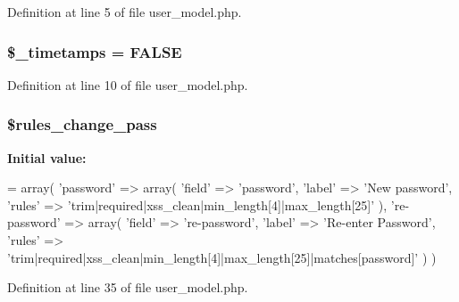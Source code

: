 Definition at line 5 of file user\-\_\-model.\-php.

\hypertarget{class_user__model_a0af45edfd9d801cbc582a244700cd824}{
\subsubsection[{\$\-\_\-timetamps}]{\setlength{\rightskip}{0pt plus 5cm}\$\-\_\-timetamps = F\-A\-L\-S\-E\hspace{0.3cm}{\ttfamily [protected]}}}\label{class_user__model_a0af45edfd9d801cbc582a244700cd824}


Definition at line 10 of file user\-\_\-model.\-php.

\hypertarget{class_user__model_adf938552f461a7e300f74469c1837bbf}{
\subsubsection[{\$rules\-\_\-change\-\_\-pass}]{\setlength{\rightskip}{0pt plus 5cm}\$rules\-\_\-change\-\_\-pass}}\label{class_user__model_adf938552f461a7e300f74469c1837bbf}
{\bfseries Initial value\-:}
\begin{DoxyCode}
= array(
        \textcolor{stringliteral}{'password'} => array(
            \textcolor{stringliteral}{'field'} => \textcolor{stringliteral}{'password'}, 
            \textcolor{stringliteral}{'label'} => \textcolor{stringliteral}{'New password'}, 
            \textcolor{stringliteral}{'rules'} => \textcolor{stringliteral}{'trim|required|xss\_clean|min\_length[4]|max\_length[25]'}
        ), 
        \textcolor{stringliteral}{'re-password'} => array(
            \textcolor{stringliteral}{'field'} => \textcolor{stringliteral}{'re-password'}, 
            \textcolor{stringliteral}{'label'} => \textcolor{stringliteral}{'Re-enter Password'}, 
            \textcolor{stringliteral}{'rules'} => \textcolor{stringliteral}{'trim|required|xss\_clean|min\_length[4]|max\_length[25]|matches[password]'}
        )
    )
\end{DoxyCode}


Definition at line 35 of file user\-\_\-model.\-php.

